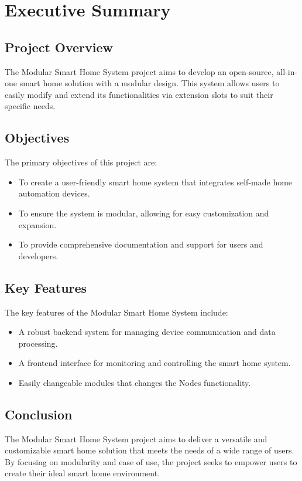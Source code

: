 \chapter{Executive Summary}

\section{Project Overview}
The Modular Smart Home System project aims to develop an open-source, 
all-in-one smart home solution with a modular design. This system 
allows users to easily modify and extend its functionalities via 
extension slots to suit their specific needs.

\section{Objectives}
The primary objectives of this project are:
\begin{itemize}
    \item To create a user-friendly smart home system that integrates self-made home automation devices.
    \item To ensure the system is modular, allowing for easy customization and expansion.
    \item To provide comprehensive documentation and support for users and developers.
\end{itemize}

\section{Key Features}
The key features of the Modular Smart Home System include:
\begin{itemize}
    \item A robust backend system for managing device communication and data processing.
    \item A frontend interface for monitoring and controlling the smart home system.
    \item Easily changeable modules that changes the Nodes functionality.
\end{itemize}

\section{Conclusion}
The Modular Smart Home System project aims to deliver a versatile 
and customizable smart home solution that meets the needs of a wide 
range of users. By focusing on modularity and ease of use, the project 
seeks to empower users to create their ideal smart home environment.